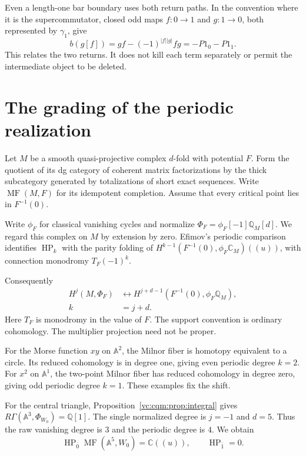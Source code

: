 Even a length-one bar boundary uses both return paths.
In the convention where it is the supercommutator,
closed odd maps $f:0\to1$ and $g:1\to0$, both represented
by $\gamma_1$, give
\[
 b(g[f])=gf-(-1)^{|f||g|}fg=-P1_0-P1_1.
\]
This relates the two returns. It does not kill each term
separately or permit the intermediate object to be deleted.

\section{The grading of the periodic realization}

Let $M$ be a smooth quasi-projective complex $d$-fold
with potential $F$.
Form the quotient of its dg category of coherent matrix
factorizations by the thick subcategory generated by
totalizations of short exact sequences.
Write $\operatorname{MF}(M,F)$ for its idempotent completion.
Assume that every critical point lies in $F^{-1}(0)$.

Write $\phi_F$ for classical vanishing cycles and normalize
$\Phi_F=\phi_F[-1]\mathbb Q_M[d]$.
We regard this complex on $M$ by extension by zero.
Efimov's periodic comparison identifies
$\operatorname{HP}_k$ with the parity folding of
$H^{k-1}(F^{-1}(0),\phi_F\mathbb C_M)((u))$,
with connection monodromy $T_F(-1)^k$.

Consequently
\begin{equation}\label{mc:cgcr:eq:degrees}
 \begin{aligned}
 H^j(M,\Phi_F)&\longleftrightarrow
 H^{j+d-1}(F^{-1}(0),\phi_F\mathbb Q_M),\\
 k&=j+d.
 \end{aligned}
\end{equation}
Here $T_F$ is monodromy in the value of $F$.
The support convention is ordinary cohomology. The multiplier
projection need not be proper.

For the Morse function $xy$ on $\mathbb A^2$, the Milnor
fiber is homotopy equivalent to a circle.
Its reduced cohomology is in degree one, giving even
periodic degree $k=2$.
For $x^2$ on $\mathbb A^1$, the two-point Milnor
fiber has reduced cohomology in degree zero, giving odd
periodic degree $k=1$. These examples fix the shift.

For the central triangle,
Proposition~\ref{vc:cqm:prop:integral} gives
$R\Gamma(\mathbb A^3,\Phi_{W_0})=\mathbb Q[1]$.
The single normalized degree is $j=-1$ and $d=5$.
Thus the raw vanishing degree is $3$ and the periodic
degree is $4$. We obtain
\begin{equation}\label{mc:cgcr:eq:central-periodic}
 \operatorname{HP}_{\bar0}\operatorname{MF}(\mathbb A^5,W_0)
      =\mathbb C((u)),\qquad
 \operatorname{HP}_{\bar1}=0.
\end{equation}

